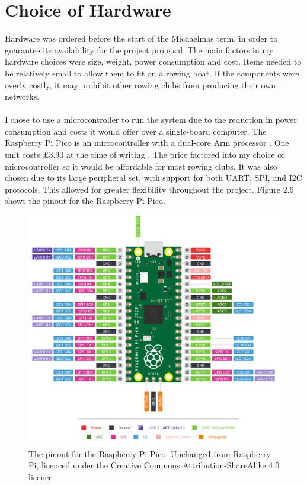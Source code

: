 \documentclass[12pt,a4paper]{report}
\begin{document}
\section{Choice of Hardware} 
Hardware was ordered before the start of the Michaelmas term, in order to guarantee its availability for the project proposal. The main factors in my hardware choices were size, weight, power consumption and cost. Items needed to be relatively small to allow them to fit on a rowing boat. If the components were overly costly, it may prohibit other rowing clubs from producing their own networks. \\ \\
I chose to use a microcontroller to run the system due to the reduction in power consumption and costs it would offer over a single-board computer. The Raspberry Pi Pico is an microcontroller with a dual-core Arm processor \cite{rp2040}. One unit costs £3.90 at the time of writing \cite{buypico}. The price factored into my choice of microcontroller so it would be affordable for most rowing clubs. It was also chosen due to its large peripheral set, with support for both UART, SPI, and I2C protocols. This allowed for greater flexibility throughout the project. Figure 2.6 shows the pinout for the Raspberry Pi Pico. 
\begin{figure}[h]
\begin{center}
\includegraphics[scale=0.2]{picopinout.png}
\end{center}
\caption{The pinout for the Raspberry Pi Pico. Unchanged from Raspberry Pi, licenced under the Creative Commons Attribution-ShareAlike 4.0 licence \cite{pinout}}
\end{figure}
\end{document}
